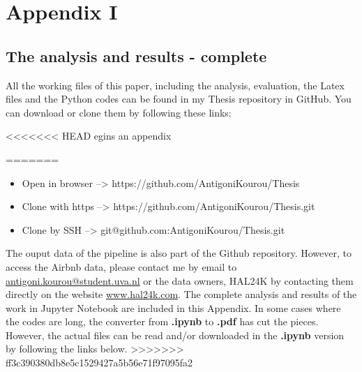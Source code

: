 %
%
\large
\chapter{Appendix I}
\label{app:app01}
\section{The analysis and results - complete}
All the working files of this paper, including the analysis, evaluation, the Latex files and the Python codes can be found in my Thesis repository in GitHub. You can download or clone them by following these links:

<<<<<<< HEAD
egins an appendix


\listoftodos

=======
\begin{itemize}
\item Open in browser --> https://github.com/AntigoniKourou/Thesis
\item Clone with https --> https://github.com/AntigoniKourou/Thesis.git
\item Clone by SSH --> git@github.com:AntigoniKourou/Thesis.git
\end{itemize}
The ouput data of the pipeline is also part of the Github repository. However, to access the Airbnb data, please contact me by email to \href{mailto:antigoni.kourou@student.uva.nl}{antigoni.kourou@student.uva.nl} or the data owners, HAL24K by contacting them directly on the website \href{http://hal24k.com/} {www.hal24k.com}. The complete analysis and results of the work in Jupyter Notebook are included in this Appendix. In some cases where the codes are long, the converter from \textbf{.ipynb} to \textbf{.pdf} has cut the pieces. However, the actual files can be read and/or downloaded in the \textbf{.ipynb} version by following the links below.
>>>>>>> ff3c390380db8e5c1529427a5b56e71f97095fa2

